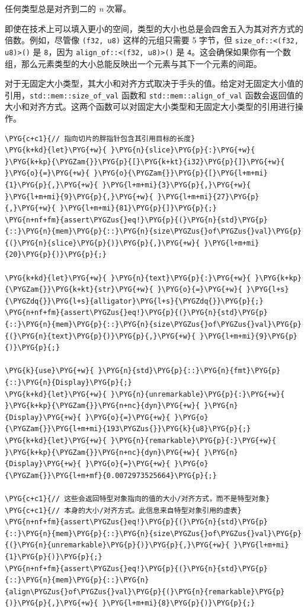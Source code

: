 任何类型总是对齐到二的 \emph{n} 次幂。

即使在技术上可以填入更小的空间，类型的大小也总是会四舍五入为其对齐方式的倍数。例如，尽管像 \texttt{(f32, u8)} 这样的元组只需要 5 字节，但 \texttt{size\_of::<(f32, u8)>()} 是 \texttt{8}，因为 \texttt{align\_of::<(f32, u8)>()} 是 \texttt{4}。这会确保如果你有一个数组，那么元素类型的大小总能反映出一个元素与其下一个元素的间距。

对于无固定大小类型，其大小和对齐方式取决于手头的值。给定对无固定大小值的引用，\texttt{std::mem::size\_of\_val} 函数和 \texttt{std::mem::align\_of\_val} 函数会返回值的大小和对齐方式。这两个函数可以对固定大小类型和无固定大小类型的引用进行操作。

\begin{Verbatim}[commandchars=\\\{\},breaklines=true,breakanywhere=true,fontsize=\codefont,xleftmargin=17bp]
\PYG{c+c1}{// 指向切片的胖指针包含其引用目标的长度}
\PYG{k+kd}{let}\PYG{+w}{ }\PYG{n}{slice}\PYG{p}{:}\PYG{+w}{ }\PYG{k+kp}{\PYGZam{}}\PYG{p}{[}\PYG{k+kt}{i32}\PYG{p}{]}\PYG{+w}{ }\PYG{o}{=}\PYG{+w}{ }\PYG{o}{\PYGZam{}}\PYG{p}{[}\PYG{l+m+mi}{1}\PYG{p}{,}\PYG{+w}{ }\PYG{l+m+mi}{3}\PYG{p}{,}\PYG{+w}{ }\PYG{l+m+mi}{9}\PYG{p}{,}\PYG{+w}{ }\PYG{l+m+mi}{27}\PYG{p}{,}\PYG{+w}{ }\PYG{l+m+mi}{81}\PYG{p}{]}\PYG{p}{;}
\PYG{n+nf+fm}{assert\PYGZus{}eq!}\PYG{p}{(}\PYG{n}{std}\PYG{p}{::}\PYG{n}{mem}\PYG{p}{::}\PYG{n}{size\PYGZus{}of\PYGZus{}val}\PYG{p}{(}\PYG{n}{slice}\PYG{p}{)}\PYG{p}{,}\PYG{+w}{ }\PYG{l+m+mi}{20}\PYG{p}{)}\PYG{p}{;}

\PYG{k+kd}{let}\PYG{+w}{ }\PYG{n}{text}\PYG{p}{:}\PYG{+w}{ }\PYG{k+kp}{\PYGZam{}}\PYG{k+kt}{str}\PYG{+w}{ }\PYG{o}{=}\PYG{+w}{ }\PYG{l+s}{\PYGZdq{}}\PYG{l+s}{alligator}\PYG{l+s}{\PYGZdq{}}\PYG{p}{;}
\PYG{n+nf+fm}{assert\PYGZus{}eq!}\PYG{p}{(}\PYG{n}{std}\PYG{p}{::}\PYG{n}{mem}\PYG{p}{::}\PYG{n}{size\PYGZus{}of\PYGZus{}val}\PYG{p}{(}\PYG{n}{text}\PYG{p}{)}\PYG{p}{,}\PYG{+w}{ }\PYG{l+m+mi}{9}\PYG{p}{)}\PYG{p}{;}

\PYG{k}{use}\PYG{+w}{ }\PYG{n}{std}\PYG{p}{::}\PYG{n}{fmt}\PYG{p}{::}\PYG{n}{Display}\PYG{p}{;}
\PYG{k+kd}{let}\PYG{+w}{ }\PYG{n}{unremarkable}\PYG{p}{:}\PYG{+w}{ }\PYG{k+kp}{\PYGZam{}}\PYG{n+nc}{dyn}\PYG{+w}{ }\PYG{n}{Display}\PYG{+w}{ }\PYG{o}{=}\PYG{+w}{ }\PYG{o}{\PYGZam{}}\PYG{l+m+mi}{193\PYGZus{}}\PYG{k}{u8}\PYG{p}{;}
\PYG{k+kd}{let}\PYG{+w}{ }\PYG{n}{remarkable}\PYG{p}{:}\PYG{+w}{ }\PYG{k+kp}{\PYGZam{}}\PYG{n+nc}{dyn}\PYG{+w}{ }\PYG{n}{Display}\PYG{+w}{ }\PYG{o}{=}\PYG{+w}{ }\PYG{o}{\PYGZam{}}\PYG{l+m+mf}{0.0072973525664}\PYG{p}{;}

\PYG{c+c1}{// 这些会返回特型对象指向的值的大小/对齐方式，而不是特型对象}
\PYG{c+c1}{// 本身的大小/对齐方式。此信息来自特型对象引用的虚表}
\PYG{n+nf+fm}{assert\PYGZus{}eq!}\PYG{p}{(}\PYG{n}{std}\PYG{p}{::}\PYG{n}{mem}\PYG{p}{::}\PYG{n}{size\PYGZus{}of\PYGZus{}val}\PYG{p}{(}\PYG{n}{unremarkable}\PYG{p}{)}\PYG{p}{,}\PYG{+w}{ }\PYG{l+m+mi}{1}\PYG{p}{)}\PYG{p}{;}
\PYG{n+nf+fm}{assert\PYGZus{}eq!}\PYG{p}{(}\PYG{n}{std}\PYG{p}{::}\PYG{n}{mem}\PYG{p}{::}\PYG{n}{align\PYGZus{}of\PYGZus{}val}\PYG{p}{(}\PYG{n}{remarkable}\PYG{p}{)}\PYG{p}{,}\PYG{+w}{ }\PYG{l+m+mi}{8}\PYG{p}{)}\PYG{p}{;}
\end{Verbatim}

